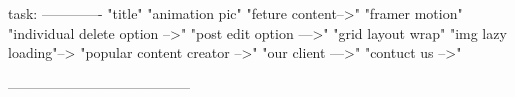 task:
-------------
"title"
"animation pic"
"feture content-->"
"framer motion"
"individual delete option -->"
"post edit option --->"
"grid layout wrap"
"img lazy loading"-->
"popular content creator -->"
"our client --->"
"contuct us -->"

---------------------------------------

